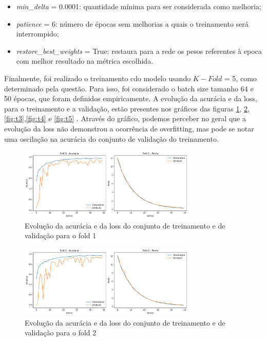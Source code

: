 \documentclass[]{abntex2}
\begin{document}
\begin{itemize}
    \item \textit{min\_delta} = 0.0001:  quantidade mínima para ser considerada como melhoria;
    \item \textit{patience} = 6: número de épocas sem melhorias a quais o treinamento será interrompido;
    \item \textit{restore\_best\_weights} = True: restaura para a rede os pesos referentes à epoca com melhor resultado na métrica escolhida.
\end{itemize}

Finalmente, foi realizado o treinamento cdo modelo usando $K-Fold$ = 5, como determinado pela questão. Para isso, foi considerado o batch size tamanho 64 e 50 épocas, que foram definidos empiricamente. A evolução da acurácia e da loss, para o treinamento e a validação, estão presentes nos gráficos das figuras \ref{fig:t1}, \ref{fig:t2}, \ref{fig:t3},\ref{fig:t4} e \ref{fig:t5} . Através do gráfico, podemos perceber no geral que a evolução da loss não demonstrou a ocorrência de overfitting, mas pode se notar uma oscilação na acurácia do conjunto de validação do treinamento.

\begin{figure}[H]
    \centering 
    \includegraphics[width=0.75\textwidth]{imgs/ex2/train_f1.png}
    \caption{Evolução da acurácia e da loss do conjunto de treinamento e de validação para o fold 1}
    \label{fig:t1} %
\end{figure}

\begin{figure}[H]
    \centering 
    \includegraphics[width=0.75\textwidth]{imgs/ex2/train_f2.png}
    \caption{Evolução da acurácia e da loss do conjunto de treinamento e de validação para o fold 2}
    \label{fig:t2} %
\end{figure}
\end{document}
